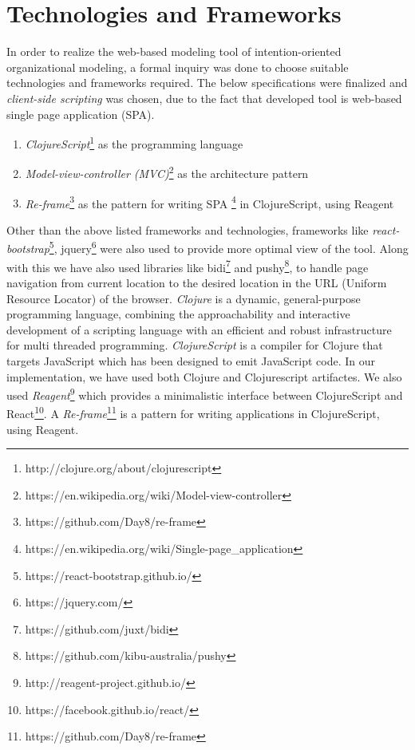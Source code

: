 \section{Technologies and Frameworks}
\label{subsec:specifications}
In order to realize the web-based modeling tool of intention-oriented organizational modeling, a formal inquiry was done to choose suitable technologies and frameworks required. The below specifications were finalized and \textit{client-side scripting} \cite{Sierra2012} was chosen, due to the fact that developed tool is web-based single page application (SPA). 

\begin{enumerate}   
	\item \textit{ClojureScript}\footnote{http://clojure.org/about/clojurescript} as the programming language
	\item \textit{Model-view-controller (MVC)}\footnote{https://en.wikipedia.org/wiki/Model-view-controller}  as the architecture pattern
	\item \textit{Re-frame}\footnote{https://github.com/Day8/re-frame} as the pattern for writing SPA \footnote{https://en.wikipedia.org/wiki/Single-page\_application} in ClojureScript, using Reagent	
\end{enumerate}

Other than the above listed frameworks and technologies, frameworks like \textit{react-bootstrap}\footnote{https://react-bootstrap.github.io/}, jquery\footnote{https://jquery.com/} were also used to provide more optimal view of the tool. Along with this we have also used libraries like bidi\footnote{https://github.com/juxt/bidi} and pushy\footnote{https://github.com/kibu-australia/pushy}, to handle page navigation from current location to the desired location in the URL (Uniform Resource Locator) of the browser. \textit{Clojure} is a dynamic, general-purpose programming language, combining the approachability and interactive development of a scripting language with an efficient and robust infrastructure for multi threaded programming. \textit{ClojureScript} is a compiler for Clojure that targets JavaScript which has been designed to emit JavaScript code. In our implementation, we have used both Clojure and Clojurescript artifactes. We also used \textit{Reagent}\footnote{http://reagent-project.github.io/} which provides a minimalistic interface between ClojureScript and React\footnote{https://facebook.github.io/react/}. A \textit{Re-frame}\footnote{https://github.com/Day8/re-frame} is a pattern for writing applications in ClojureScript, using Reagent.

